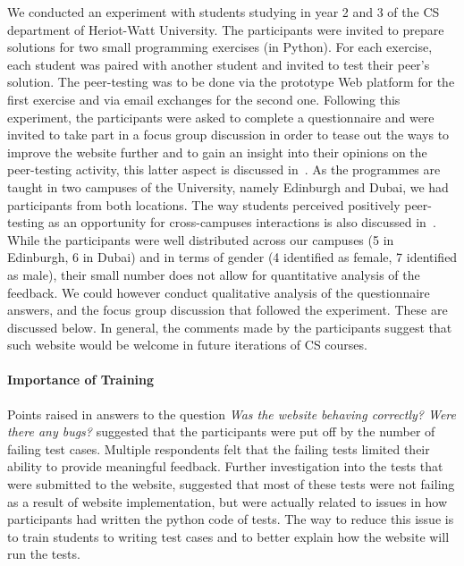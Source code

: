 \documentclass[sigplan,10pt,review]{acmart}\settopmatter{printfolios=true}
\begin{document}
We conducted an experiment with students studying in year 2 and 3 of
the \ac{CS} department of Heriot-Watt University.
%
The participants were invited to prepare solutions for two small
programming exercises (in Python). For each exercise, each student was
paired with another student and invited to test their peer's
solution. The peer-testing was to be done via the prototype Web
platform for the first exercise and via email exchanges for the second one.
%
Following this experiment, the participants were asked to complete a
questionnaire and were invited to take part in a focus group
discussion in order to tease out the ways to improve the website
further and to gain an insight into their opinions on the peer-testing
activity, this latter aspect is discussed
in~\cite{GroHamKumMaaMcGrShaWelZan_STEM-HE-2017}.
%
As the programmes are taught in two campuses of the University, namely
Edinburgh and Dubai, we had participants from both locations. The way
students perceived positively peer-testing as an opportunity for
cross-campuses interactions is also discussed
in~\cite{GroHamKumMaaMcGrShaWelZan_STEM-HE-2017}. While the
participants were well distributed across our campuses (5 in
Edinburgh, 6 in Dubai) and in terms of gender (4 identified as female,
7 identified as male), their small number does not allow for
quantitative analysis of the feedback. We could however conduct
qualitative analysis of
the questionnaire answers, and the focus group discussion that
followed the experiment. These are discussed below.  In general, the
comments made by the participants suggest that such website would be
welcome in future iterations of \ac{CS} courses.



\paragraph{Importance of Training}

Points raised in answers to the question \emph{Was the website
  behaving correctly? Were there any bugs?}  suggested that the
participants were put off by the number of failing test cases.
Multiple respondents felt that the failing tests limited their ability
to provide meaningful feedback. Further investigation into the tests
that were submitted to the website, suggested that most of these tests
were not failing as a result of website implementation, but were
actually related to issues in how participants had written the python
code of tests. The way to reduce this issue is to train students to
writing test cases and to better explain how the website will run the
tests.
\end{document}
